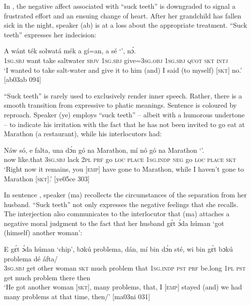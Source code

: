 In , the negative affect associated with “suck teeth” is downgraded to signal a frustrated effort and an ensuing change of heart. After her grandchild has fallen sick in the night, speaker (ab) is at a loss about the appropriate treatment. “Suck teeth” expresses her indecision: 


\ea%
    \label{ex:key:1664}
    \gll A    wánt  ték    solwatá    mék    a    gí=an,
a    sé    ‘’,  nɔ́.\\
\textsc{1sg.sbj}  want  take    saltwater  \textsc{sbjv}    \textsc{1sg.sbj}  give=\textsc{3sg.obj}
\textsc{1sg.sbj}  \textsc{quot}    \textsc{skt}    \textsc{intj}\\

\glt ‘I wanted to take salt-water and give it to him (and) I said (to myself) 
\textsc{[skt]} no.’ [ab03ab 094]
\z

“Suck teeth” is rarely used to exclusively render inner speech. Rather, there is a smooth transition from expressive to phatic meanings. Sentence  is coloured by reproach. Speaker (ye) employs “suck teeth” – albeit with a humorous undertone – to indicate his irritation with the fact that he has not been invited to go eat at Marathon (a restaurant), while his interlocutors had:


\ea%
    \label{ex:key:1665}
    \gll Náw    só,    e    falta,  una  dɔ́n  gó  na  Marathon,
mí    nó  gó  na  Marathon  ‘’.\\
now    like.that  \textsc{3sg.sbj}  lack    \textsc{2pl}  \textsc{prf}  go  \textsc{loc}  \textsc{place}
\textsc{1sg.indp}  \textsc{neg}  go  \textsc{loc}  \textsc{place}    \textsc{skt}\\

\glt ‘Right now it remains, you [\textsc{emp}] have gone to Marathon, while 
I haven’t gone to Marathon \textsc{[skt]}.’ [ye05ce 303]
\z

In sentence , speaker (ma) recollects the circumstances of the separation from her husband. “Suck teeth” not only expresses the negative feelings that she recalls. The interjection also communicates to the interlocutor that (ma) attaches a negative moral judgment to the fact that her husband gɛ́t ɔ́da húman ‘got (himself) another woman’:


\ea%
    \label{ex:key:1666}
    \gll E    gɛ́t  ɔ́da    húman  ‘chip’,  bɔkú  problema,
dán,    mí    bin  dɔ́n  sté,    wi  bin  gɛ́t  bɔkú  
problema  dé    áfta/\\
\textsc{3sg.sbj}  get  other  woman  \textsc{skt}    much  problem
that    \textsc{1sg.indp}  \textsc{pst}  \textsc{prf}  be.long  \textsc{1pl}  \textsc{pst}  get  much
problem    there  then\\
\glt ‘He got another woman \textsc{[skt]}, many problems, that, I [\textsc{emp}] stayed 
(and) we had many problems at that time, then/’ [ma03ni 031]
\z

